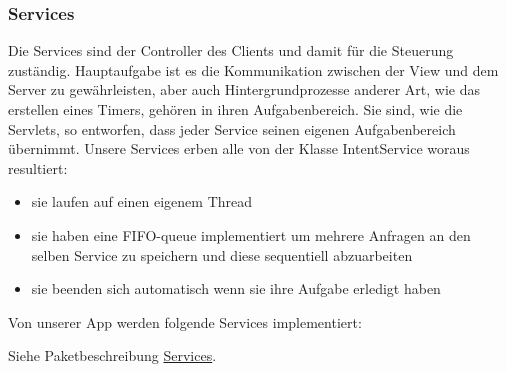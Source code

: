 	\subsubsection{Services}
	Die Services sind der Controller des Clients und damit für die Steuerung zuständig. Hauptaufgabe ist es die Kommunikation zwischen der View und dem Server zu gewährleisten, aber auch Hintergrundprozesse anderer Art, wie das erstellen eines Timers, gehören in ihren Aufgabenbereich.
Sie sind, wie die Servlets, so entworfen, dass jeder Service seinen eigenen Aufgabenbereich übernimmt.
\newline Unsere Services erben alle von der Klasse IntentService woraus resultiert:
\begin{itemize}
\item sie laufen auf einen eigenem Thread
\item sie haben eine FIFO-queue implementiert um mehrere Anfragen an den selben Service zu speichern und diese sequentiell abzuarbeiten
\item sie beenden sich automatisch wenn sie ihre Aufgabe erledigt haben
\end{itemize}

Von unserer App werden folgende Services implementiert:
\newline


\begin {center}
\end {center}
Siehe Paketbeschreibung \hyperlink{controler.service}{Services}.

